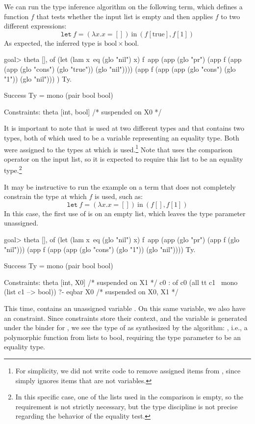 \documentclass[a4paper, 11pt]{book}
\begin{document}
\noindent
We can run the type inference algorithm on the following term, which defines a
function $f$ that tests whether the input list is empty and then applies $f$ to
two different expressions:
$$
\mathtt{let}\ f = (\lambda x. x = [])\ \mathrm{in}\ (f [\mathrm{true}], f [1])
$$
As expected, the inferred type is $\mathrm{bool} \times \mathrm{bool}$.
\begin{elpicode}
goal> theta [],
  of (let (lam x\ eq (glo "nil") x) f\
       app (app (glo "pr")
        (app f (app (app (glo "cons") (glo "true")) (glo "nil"))))
        (app f (app (app (glo "cons") (glo "1"))    (glo "nil")))
     ) Ty.

Success
  Ty = mono (pair bool bool)
 
Constraints:
  theta [int, bool]  /* suspended on X0 */
\end{elpicode}
It is important to note that  is used at two different types and that
\elpi{theta} contains two types, both of which used to be a variable representing an
equality type. Both were assigned to the types at which \elpi{f} is used.\footnote{
For simplicity, we did not write code to remove assigned items from
\elpi{theta}, since \elpi{bind} simply ignores items that are not variables.}
Note that \elpi{f} uses the comparison operator on the input list, so it is
expected to require this list to be an equality type.\footnote{In this specific
case, one of the lists used in the comparison is empty, so the requirement is
not strictly necessary, but the type discipline is not precise regarding the
behavior of the equality test.}

It may be instructive to run the example on a term that does not completely
constrain the type at which $f$ is used, such as:
$$
\mathtt{let}\ f = (\lambda x. x = [])\ \mathrm{in}\ (f [], f [1])
$$
In this case, the first use of  is on an empty list, which leaves the
type parameter unassigned.
\begin{elpicode}
goal> theta [],
  of (let (lam x\ eq (glo "nil") x) f\
        app (app (glo "pr")
          (app f (glo "nil")))
          (app f (app (app (glo "cons") (glo "1")) (glo "nil"))))
     Ty.

Success
  Ty = mono (pair bool bool)
 
Constraints:
 theta [int, X0] 
   /* suspended on X1 */
 {c0} : of c0 (all tt c1 \ mono (list c1 --> bool)) ?- eqbar X0 
   /* suspended on X0, X1 */
\end{elpicode}
This time,  contains an unassigned variable . On this same
variable, we also have an  constraint. Since constraints store their
context, and the variable is generated under the binder for \elpi{f}, we see
the type of \elpi{f} as synthesized by the algorithm: \ocaml{''a list -> bool},
i.e., a polymorphic function from lists to bool, requiring the type parameter to
be an equality type.
\end{document}
